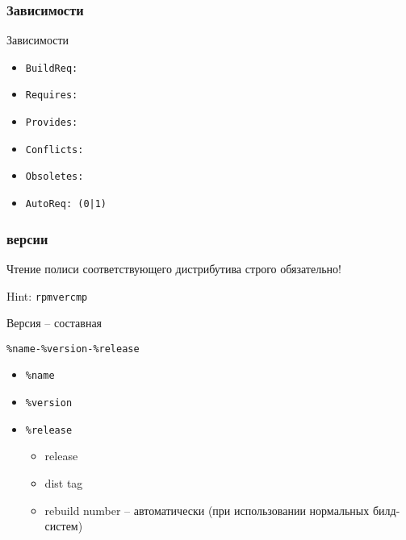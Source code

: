 \begin{frame}
	\frametitle{Зависимости}

	\begin{block}{ Зависимости}
		\begin{itemize}
			\item {\tt BuildReq:}
			\item {\tt Requires:}
			\item {\tt Provides:}
			\item {\tt Conflicts:}
			\item {\tt Obsoletes:}
			\item {\tt AutoReq: (0|1)}
		\end{itemize}
	\end{block}

\end{frame}

\begin{frame}
	\frametitle{версии}

	\Large{Чтение полиси соответствующего дистрибутива строго обязательно!}

	Hint: {\tt rpmvercmp}

	\begin{block}{ Версия -- составная}

		{\tt \%name-\%version-\%release}

		\begin{itemize}
			\item {\tt \%name}
			\item {\tt \%version}
			\item {\tt \%release}
			\begin{itemize}
				\item release
				\item dist tag
				\item rebuild number -- автоматически (при использовании нормальных билд-систем)
			\end{itemize}
		\end{itemize}
	\end{block}

\end{frame}



